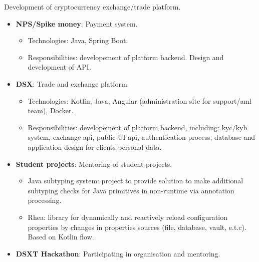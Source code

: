 \documentclass{cv}
\begin{document}
\begin{cvblock}{%
  }

  Development of cryptocurrency exchange/trade platform.

  \begin{itemize}
    \item \textbf{NPS/Spike money}: Payment system.
      \begin{itemize}
        \item Technologies: Java, Spring Boot.
        \item Responsibilities: developement of platform backend.
          Design and development of API.
      \end{itemize}
    \item \textbf{DSX}: Trade and exchange platform.
      \begin{itemize}
        \item Technologies: Kotlin, Java, Angular (administration site for support/aml team), Docker.
        \item Responsibilities: developement of platform backend, including:
          kyc/kyb system, exchange api, public UI api, authentication process,
          database and application design for clients personal data.
      \end{itemize}
    \item \textbf{Student projects}: Mentoring of student projects.
      \begin{itemize}
        \item Java subtyping system: project to provide solution to make additional
          subtyping checks for Java primitives in non-runtime via annotation processing.
        \item Rhea: library for dynamically and reactively reload configuration properties
          by changes in properties sources (file, database, vault, e.t.c). Based on
          Kotlin flow.
      \end{itemize}
    \item \textbf{DSXT Hackathon}: Participating in organisation and mentoring.
  \end{itemize}
\end{cvblock}

\vspace{2em}
\end{document}
